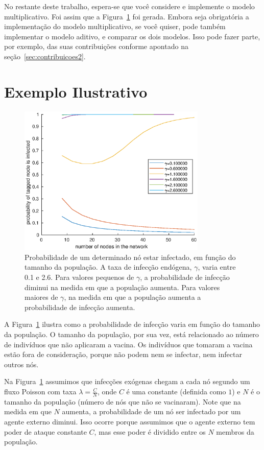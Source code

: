 \documentclass[a4paper]{article}
\begin{document}
No restante deste trabalho, espera-se que você considere e implemente o modelo multiplicativo.  Foi assim que a Figura~\ref{fig:probinf} foi gerada.  Embora seja obrigatória a implementação do modelo multiplicativo, se você quiser, pode também implementar o modelo aditivo, e comparar os dois modelos.  Isso pode fazer parte, por exemplo, das suas contribuições conforme apontado na seção~\ref{sec:contribuicoes2}.

\label{sec:admul}

\section{Exemplo Ilustrativo}


\begin{figure}
\centering
\includegraphics[width=0.8\textwidth]{epidemic_simulations.eps}
\caption{\label{fig:contamination}Probabilidade de um determinado nó estar infectado, em função do tamanho da população. A taxa de infecção endógena, $\gamma$, varia entre 0.1 e 2.6.  Para valores pequenos de $\gamma$,  a probabilidade de infecção diminui na medida em que a população aumenta.  Para valores maiores de $\gamma$, na medida em que a população aumenta a probabilidade de infecção aumenta. }
\label{fig:probinf}
\end{figure}


A Figura~\ref{fig:probinf} ilustra como a probabilidade de infecção varia em função do tamanho da população.  O tamanho da população, por sua vez, está relacionado ao número de indivíduos que não aplicaram a vacina.   Os indivíduos que tomaram a vacina estão fora de consideração, porque não podem nem se infectar, nem infectar outros nós.


Na Figura~\ref{fig:probinf} assumimos que 
infecções exógenas chegam a cada nó segundo um fluxo Poisson com taxa $\lambda=\frac{C}{N}$, onde $C$ é uma constante (definida como $1$) e $N$ é o tamanho da população (número de nós que não se vacinaram).  Note que na medida em que $N$ aumenta, a probabilidade de um nó ser infectado por um agente externo diminui.  Isso ocorre porque assumimos que o agente externo tem poder de ataque constante $C$, mas esse poder é dividido entre os $N$ membros da população.
\end{document}
